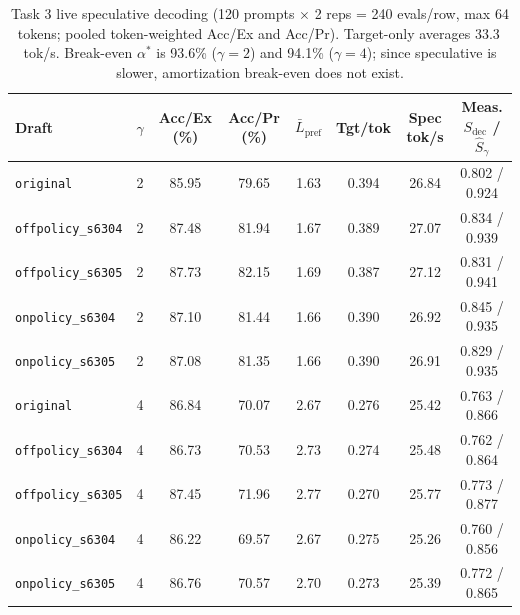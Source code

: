 \documentclass{article}
\begin{document}
\begin{table}[t]
\centering\footnotesize
\caption{Task 3 live speculative decoding (120 prompts $\times$ 2 reps = 240 evals/row, max 64 tokens; pooled token-weighted Acc/Ex and Acc/Pr). Target-only averages 33.3\,tok/s. Break-even $\alpha^*$ is 93.6\% ($\gamma=2$) and 94.1\% ($\gamma=4$); since speculative is slower, amortization break-even does not exist.}
\label{tab:t3spec}
\begin{tabular}{lccccccc}
\toprule
Draft & $\gamma$ & Acc/Ex (\%) & Acc/Pr (\%) & $\bar{L}_{\text{pref}}$ & Tgt/tok & Spec tok/s & Meas. $S_{\text{dec}}$ / $\hat{S}_\gamma$ \\
\midrule
\texttt{original} & 2 & 85.95 & 79.65 & 1.63 & 0.394 & 26.84 & 0.802 / 0.924 \\
\texttt{offpolicy\_s6304} & 2 & 87.48 & 81.94 & 1.67 & 0.389 & 27.07 & 0.834 / 0.939 \\
\texttt{offpolicy\_s6305} & 2 & 87.73 & 82.15 & 1.69 & 0.387 & 27.12 & 0.831 / 0.941 \\
\texttt{onpolicy\_s6304} & 2 & 87.10 & 81.44 & 1.66 & 0.390 & 26.92 & 0.845 / 0.935 \\
\texttt{onpolicy\_s6305} & 2 & 87.08 & 81.35 & 1.66 & 0.390 & 26.91 & 0.829 / 0.935 \\
\midrule
\texttt{original} & 4 & 86.84 & 70.07 & 2.67 & 0.276 & 25.42 & 0.763 / 0.866 \\
\texttt{offpolicy\_s6304} & 4 & 86.73 & 70.53 & 2.73 & 0.274 & 25.48 & 0.762 / 0.864 \\
\texttt{offpolicy\_s6305} & 4 & 87.45 & 71.96 & 2.77 & 0.270 & 25.77 & 0.773 / 0.877 \\
\texttt{onpolicy\_s6304} & 4 & 86.22 & 69.57 & 2.67 & 0.275 & 25.26 & 0.760 / 0.856 \\
\texttt{onpolicy\_s6305} & 4 & 86.76 & 70.57 & 2.70 & 0.273 & 25.39 & 0.772 / 0.865 \\
\bottomrule
\end{tabular}
\end{table}
\end{document}
